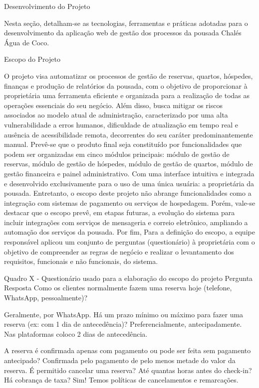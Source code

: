 ﻿Desenvolvimento do Projeto


        Nesta seção, detalham-se as tecnologias, ferramentas e práticas adotadas para o desenvolvimento da aplicação web de gestão dos processos da pousada Chalés Água de Coco.


Escopo do Projeto 


O projeto visa automatizar os processos de gestão de reservas, quartos, hóspedes, finanças e produção de relatórios da pousada, com o objetivo de proporcionar à proprietária uma ferramenta eficiente e organizada para a realização de todas as operações essenciais do seu negócio. Além disso, busca mitigar os riscos associados ao modelo atual de administração, caracterizado por uma alta vulnerabilidade a erros humanos, dificuldade de atualização em tempo real e ausência de acessibilidade remota, decorrentes do seu caráter predominantemente manual.
Prevê-se que o produto final seja constituído por funcionalidades que podem ser organizadas em cinco módulos principais: módulo de gestão de reservas, módulo de gestão de hóspedes, módulo de gestão de quartos, módulo de gestão financeira e painel administrativo. Com uma interface intuitiva e integrada e desenvolvido exclusivamente para o uso de uma única usuária: a proprietária da pousada.
Entretanto, o escopo deste projeto não abrange funcionalidades como a integração com sistemas de pagamento ou serviços de hospedagem. Porém, vale-se destacar que o escopo prevê, em etapas futuras, a evolução do sistema para incluir integrações com serviços de mensageria e correio eletrônico, ampliando a automação dos serviços da pousada.
Por fim, Para a definição do escopo, a equipe responsável aplicou um conjunto de perguntas (questionário) à proprietária com o objetivo de compreender as regras de negócio e realizar o levantamento dos requisitos, funcionais e não funcionais, do sistema. 


Quadro X - Questionário usado para a elaboração do escopo do projeto 
	Pergunta
	Resposta
	Como os clientes normalmente fazem uma reserva hoje (telefone, WhatsApp, pessoalmente)?
	

Geralmente, por WhatsApp.
	Há um prazo mínimo ou máximo para fazer uma reserva (ex: com 1 dia de antecedência)?
	 Preferencialmente, antecipadamente. Nas plataformas coloco 2 dias de antecedência.


	A reserva é confirmada apenas com pagamento ou pode ser feita sem pagamento antecipado?
	Confirmada pelo pagamento de pelo menos metade do valor da reserva.
	É permitido cancelar uma reserva? Até quantas horas antes do check-in? Há cobrança de taxa?
	Sim!  Temos políticas de cancelamentos e remarcações.


